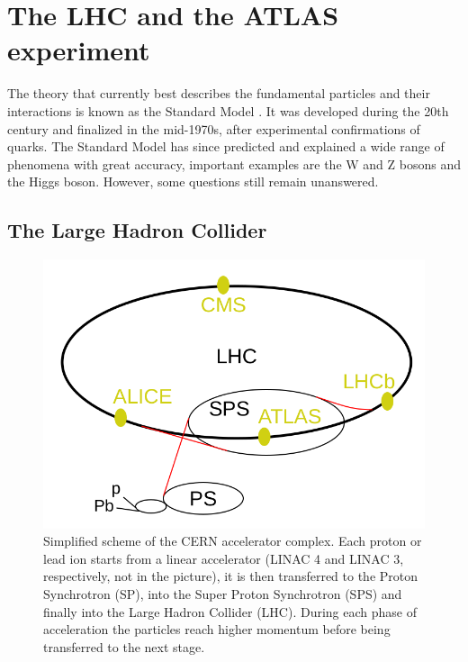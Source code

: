 
\chapter{The LHC and the ATLAS experiment}\label{chap:LHC_ATLAS}

The theory that currently best describes the fundamental particles and their interactions is known as the Standard Model \cite{Herrero1999}. It was developed during the 20th century and finalized in the mid-1970s, after experimental confirmations of quarks. The Standard Model has since predicted and explained a wide range of phenomena with great accuracy, important examples are the W and Z bosons and the Higgs boson. However, some questions still remain unanswered.


\section{The Large Hadron Collider}
\begin{figure}[h!tbpt]
    \centering
    \includegraphics[width=.7\linewidth]{Images/intro/LHC.png}
    \captionsetup{width=\captionwidth}
    \caption{Simplified scheme of the CERN accelerator complex. Each proton or lead ion starts from a linear accelerator (LINAC 4 and LINAC 3, respectively, not in the picture), it is then transferred to the Proton Synchrotron (SP), into the Super Proton Synchrotron (SPS) and finally into the Large Hadron Collider (LHC). During each phase of acceleration the particles reach higher momentum before being transferred to the next stage.}
    \label{fig:LHC}
\end{figure}



